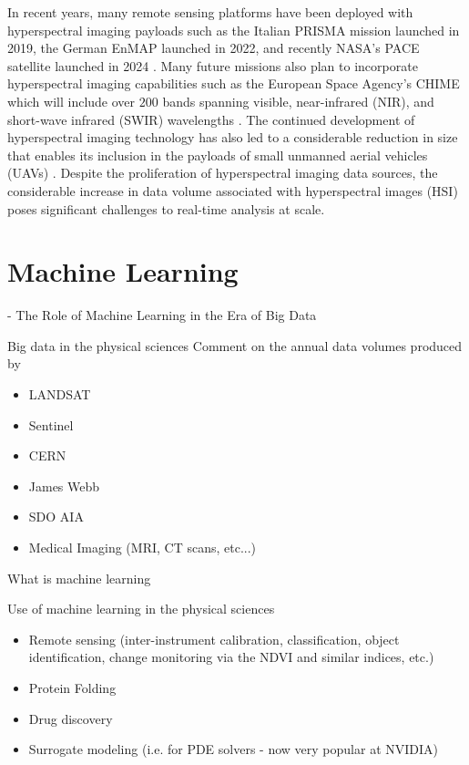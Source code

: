In recent years, many remote sensing platforms have been deployed with
hyperspectral imaging payloads such as the Italian PRISMA mission launched in
2019, the German EnMAP launched in 2022, and recently NASA's PACE satellite
launched in 2024 \cite{PRISMA-orig, EnMAP-orig, PACE-orig}. Many future missions
also plan to incorporate hyperspectral imaging capabilities such as the European
Space Agency's CHIME which will include over $200$ bands spanning visible,
near-infrared (NIR), and short-wave infrared (SWIR) wavelengths
\cite{CHIME-orig}. The continued development of hyperspectral imaging technology
has also led to a considerable reduction in size that enables its inclusion in
the payloads of small unmanned aerial vehicles (UAVs)
\cite{adao2017hyperspectral, arroyo2019implementation}. Despite the
proliferation of hyperspectral imaging data sources, the considerable increase
in data volume associated with hyperspectral images (HSI) poses significant
challenges to real-time analysis at scale.






\section{Machine Learning}

- The Role of Machine Learning in the Era of Big Data

Big data in the physical sciences
Comment on the annual data volumes produced by
\begin{itemize}
  \item LANDSAT
  \item Sentinel
  \item CERN
  \item James Webb
  \item SDO AIA
  \item Medical Imaging (MRI, CT scans, etc...)
\end{itemize}

What is machine learning

Use of machine learning in the physical sciences

\begin{itemize}
  \item Remote sensing (inter-instrument calibration, classification, object identification, change monitoring via the NDVI and similar indices, etc.)
  \item Protein Folding
  \item Drug discovery
  \item Surrogate modeling (i.e. for PDE solvers - now very popular at NVIDIA)
\end{itemize}


